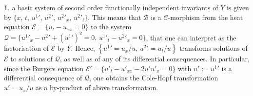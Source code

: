 \documentclass[12pt,english]{elsarticle}
\theoremstyle{plain}
\theoremstyle{plain}
\theoremstyle{remark}
\theoremstyle{plain}
\theoremstyle{definition}
\theoremstyle{definition}
\newtheorem{example}[thm]{\protect\examplename}
\providecommand{\examplename}{Example}
\begin{document}
\begin{example}
%
a basic system of second order functionally independent invariants of
$\bar{Y}$ is given by
$\{x,\,t,\,u^{1}{}',\allowbreak  \,u^{2}{}',\allowbreak \,u^{2}{}'_{x},\allowbreak  \,u^{2}{}'_{t}\}$. This means
that $\mathcal{B}$ is a $\mathcal{C}$-morphism from the heat equation
$\mathcal{E}=\{u_{t}-u_{xx}=0\}$ to the system
$\mathcal{Q}=\{u^{1}{}'_{x}-u^{2}{}'+\left (u^{1}{}'\right )^{2}=0,\,u^{1}{}'_{t}-u^{2}{}'_{x}=0
\}$, that one can interpret as the factorisation of $\mathcal{E}$ by
$\bar{Y}$. Hence,
$\left \{ u^{1}{}'=u_{x}/u,\,u^{2}{}'=u_{t}/u\right \} $ transforms solutions
of $\mathcal{E}$ to solutions of $\mathcal{Q}$, as well as of any of its
differential consequences. In particular, since the Burgers equation
$\mathcal{E}'=\{u'_{t}-u'_{xx}-2u'u'_{x}=0\}$ with $u':=u^{1}{}'$ is a
differential consequence of $\mathcal{Q}$, one obtains the Cole-Hopf transformation
$u'=u_{x}/u$ as a by-product of above transformation.
\end{example}
\end{document}
